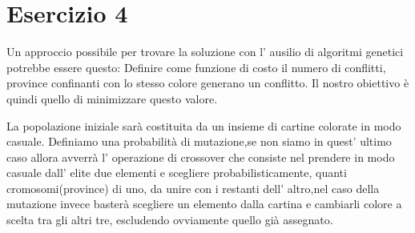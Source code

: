 	\section{Esercizio 4}
		\label{sec:es4}
		Un approccio possibile per trovare la soluzione con l' ausilio di algoritmi genetici potrebbe essere questo:
		Definire come funzione di costo il numero di conflitti, province confinanti con lo stesso colore generano un conflitto. Il nostro obiettivo è quindi quello di minimizzare questo valore.\par 
		La popolazione iniziale sarà costituita da un insieme di cartine colorate in modo casuale. Definiamo una probabilità di mutazione,se non siamo in quest' ultimo caso allora avverrà l' operazione di crossover che consiste nel prendere in modo casuale dall' elite due elementi e scegliere probabilisticamente, quanti cromosomi(province) di uno, da unire con i restanti dell' altro,nel caso  della mutazione invece basterà scegliere un elemento dalla cartina e cambiarli colore a scelta tra gli altri tre, escludendo ovviamente quello già assegnato. 
		